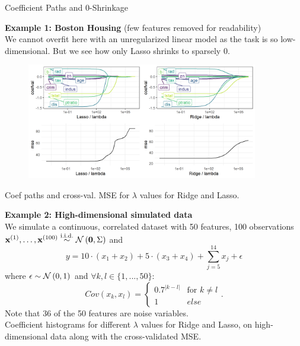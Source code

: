 \documentclass[11pt,compress,t,notes=noshow, xcolor=table]{beamer}
\begin{document}
\begin{vbframe}{Coefficient Paths and 0-Shrinkage}

\textbf{Example 1: Boston Housing} (few features removed for readability) \\

We cannot overfit here with an unregularized linear model as the task is so low-dimensional. But we see how only Lasso shrinks to sparsely 0.

\begin{figure}
\includegraphics[width=0.9\textwidth]{figure/shrinkage_1.png}\\
\end{figure}

Coef paths and cross-val. MSE for $\lambda$ values for Ridge and Lasso.

\framebreak
\textbf{Example 2: High-dimensional simulated data} \\
We simulate a continuous, correlated dataset with 50 features, 100 observations $\mathbf{x}^{(1)},\dots, \mathbf{x}^{(100)} \overset{\text{i.i.d.}}{\sim} \mathcal{N} \left(\mathbf{0}, \Sigma \right)$ and 
$$ y = 10 \cdot (x_1 + x_2) + 5 \cdot (x_3 + x_4) + \sum_{j = 5}^{14} x_j + \epsilon $$
where $\epsilon \sim \mathcal{N} \left(0, 1\right)$ and $ \forall k, l \in \{1, ..., 50\}$: 
$$Cov(x_k, x_l) = 
  \begin{cases}
   0.7^{|k-l|} & \text{for } k \neq l \\
   1 & else 
   \end{cases}. 
$$ 
Note that 36 of the 50 features are noise variables. \\
\framebreak 
Coefficient histograms for different $\lambda$ values for Ridge and Lasso, on high-dimensional data along with the cross-validated MSE.


\end{vbframe}
\end{document}
